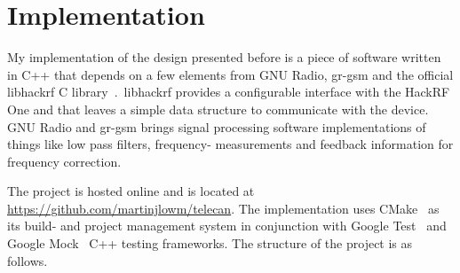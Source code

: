 \chapter{Implementation}
My implementation of the design presented before is a piece of
software written in C++ that depends on a few elements from GNU Radio,
gr-gsm and the official libhackrf C library~\cite{libhackrf}.\
libhackrf provides a configurable interface with the HackRF One and
that leaves a simple data structure to communicate with the
device. GNU Radio and gr-gsm brings signal processing software
implementations of things like low pass filters, frequency-
measurements and feedback information for frequency correction.

The project is hosted online and is located at
\url{https://github.com/martinjlowm/telecan}. The implementation uses
CMake~\cite{cmake} as its build- and project management system in
conjunction with Google Test~\cite{googletest} and Google
Mock~\cite{googlemock} C++ testing frameworks. The structure of the
project is as follows.
